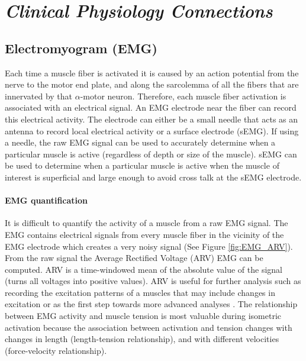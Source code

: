 \section{\textit{Clinical Physiology Connections}}

\subsection{Electromyogram (EMG)}

Each time a muscle fiber is activated it is caused by an action potential from the nerve to the motor end plate, and along the sarcolemma of all the fibers that are innervated by that $\alpha$-motor neuron. Therefore, each muscle fiber activation is associated with an electrical signal. An EMG electrode near the fiber can record this electrical activity. The electrode can either be a small needle that acts as an antenna to record local electrical activity or a surface electrode (sEMG). If using a needle, the raw EMG signal can be used to accurately determine when a particular muscle is active (regardless of depth or size of the muscle). sEMG can be used to determine when a particular muscle is active when the muscle of interest is superficial and large enough to avoid cross talk at the sEMG electrode. 

\paragraph{EMG quantification} It is difficult to quantify the activity of a muscle from a raw EMG signal. The EMG contains electrical signals from every muscle fiber in the vicinity of the EMG electrode which creates a very noisy signal (See Figure \ref{fig:EMG_ARV}). From the raw signal the Average Rectified Voltage (ARV) EMG can be computed. ARV is a time-windowed mean of the absolute value of the signal (turns all voltages into positive values). ARV is useful for further analysis such as recording the excitation patterns of a muscles that may include changes in excitation or as the first step towards more advanced analyses \cite{merletti_surface_2016}. The relationship between EMG activity and muscle tension is most valuable during isometric activation because the association between activation and tension changes with changes in length (length-tension relationship), and with different velocities (force-velocity relationship).

